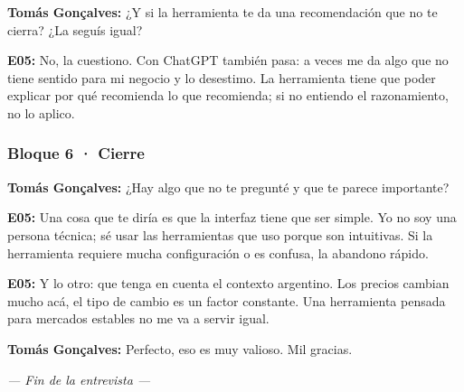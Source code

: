 \noindent\textbf{Tomás Gonçalves:} ¿Y si la herramienta te da una recomendación que no te cierra? ¿La seguís igual?

\noindent\textbf{E05:} No, la cuestiono. Con ChatGPT también pasa: a veces me da algo que no tiene sentido para mi negocio y lo desestimo. La herramienta tiene que poder explicar por qué recomienda lo que recomienda; si no entiendo el razonamiento, no lo aplico.

\subsubsection*{Bloque 6 · Cierre}

\noindent\textbf{Tomás Gonçalves:} ¿Hay algo que no te pregunté y que te parece importante?

\noindent\textbf{E05:} Una cosa que te diría es que la interfaz tiene que ser simple. Yo no soy una persona técnica; sé usar las herramientas que uso porque son intuitivas. Si la herramienta requiere mucha configuración o es confusa, la abandono rápido.

\noindent\textbf{E05:} Y lo otro: que tenga en cuenta el contexto argentino. Los precios cambian mucho acá, el tipo de cambio es un factor constante. Una herramienta pensada para mercados estables no me va a servir igual.

\noindent\textbf{Tomás Gonçalves:} Perfecto, eso es muy valioso. Mil gracias.

\begin{center}\textit{--- Fin de la entrevista ---}\end{center}
